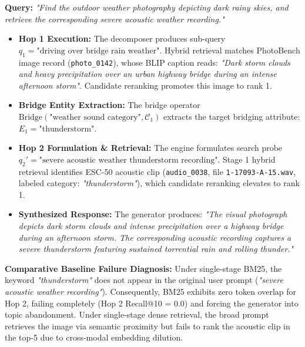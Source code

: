 \documentclass[conference]{IEEEtran}
\begin{document}
\textbf{Query:} \textit{"Find the outdoor weather photography depicting dark rainy skies, and retrieve the corresponding severe acoustic weather recording."}

\begin{itemize}
    \item \textbf{Hop 1 Execution:} The decomposer produces sub-query $q_1 = \text{"driving over bridge rain weather"}$. Hybrid retrieval matches PhotoBench image record (\texttt{photo\_0142}), whose BLIP caption reads: \textit{"Dark storm clouds and heavy precipitation over an urban highway bridge during an intense afternoon storm"}. Candidate reranking promotes this image to rank 1.
    \item \textbf{Bridge Entity Extraction:} The bridge operator $\text{Bridge}(\text{"weather sound category"}, \mathcal{C}_1)$ extracts the target bridging attribute: $E_1 = \text{"thunderstorm"}$.
    \item \textbf{Hop 2 Formulation \& Retrieval:} The engine formulates search probe $q_2' = \text{"severe acoustic weather thunderstorm recording"}$. Stage 1 hybrid retrieval identifies ESC-50 acoustic clip (\texttt{audio\_0038}, file \texttt{1-17093-A-15.wav}, labeled category: \textit{"thunderstorm"}), which candidate reranking elevates to rank 1.
    \item \textbf{Synthesized Response:} The generator produces: \textit{"The visual photograph depicts dark storm clouds and intense precipitation over a highway bridge during an afternoon storm. The corresponding acoustic recording captures a severe thunderstorm featuring sustained torrential rain and rolling thunder."}
\end{itemize}
\textbf{Comparative Baseline Failure Diagnosis:}
Under single-stage BM25, the keyword \textit{"thunderstorm"} does not appear in the original user prompt (\textit{"severe acoustic weather recording"}). Consequently, BM25 exhibits zero token overlap for Hop 2, failing completely (Hop 2 Recall@10 = 0.0) and forcing the generator into topic abandonment. Under single-stage dense retrieval, the broad prompt retrieves the image via semantic proximity but fails to rank the acoustic clip in the top-5 due to cross-modal embedding dilution.
\end{document}
